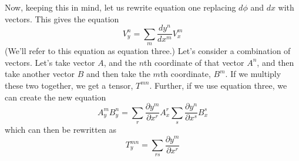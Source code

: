 Now, keeping this in mind, let us rewrite equation one replacing $d\phi$ and $dx$ with vectors. This gives the equation
\begin{equation}
    V^n_y=\sum\limits_m\frac{dy^n}{dx^m}V^m_x
\end{equation}
(We'll refer to this equation as equation three.) 
Let's consider a combination of vectors. Let's take vector $A$, and the $n$th coordinate of that vector $A^n$, and then take another vector $B$ and then take the $m$th coordinate, $B^m$. If we multiply these two together, we get a tensor, $T^{mn}$. Further, if we use equation three, we can create the new equation 
\begin{equation*}
    A_y^mB_y^n=\sum\limits_r\frac{\partial y^m}{\partial x^r}A_x^r \sum\limits_s\frac{\partial y^n}{\partial x^s} B_x^s
\end{equation*}
which can then be rewritten as 
\begin{equation}
    T_y^{mn}=\sum\limits_{rs}\frac{\partial y^m}{\partial x^r}
\end{equation}
